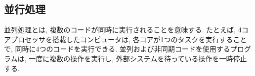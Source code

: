 \documentclass[../../../main]{subfiles}
\begin{document}
    \subsection{並行処理}\label{subsec:phraseology-concurrency}

    並列処理とは, 複数のコードが同時に実行されることを意味する.  たとえば, 4コアプロセッサを搭載したコンピュータは, 各コアが1つのタスクを実行することで, 同時に4つのコードを実行できる. 並列および非同期コードを使用するプログラムは, 一度に複数の操作を実行し, 外部システムを待っている操作を一時停止する. \cite{Concurrency}
\end{document}
